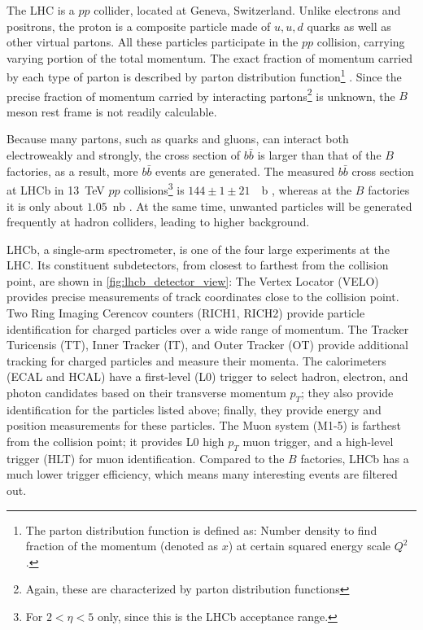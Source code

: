 The LHC is a $pp$ collider, located at Geneva, Switzerland.
Unlike electrons and positrons, the proton is a composite particle made of $u,
u, d$ quarks as well as other virtual partons.
All these particles participate in the $pp$ collision, carrying
varying portion of the total momentum.
The exact fraction of momentum carried by each type of parton is described by
parton distribution function\footnote{
    The parton distribution function is defined as:
    Number density to find fraction of the momentum (denoted as $x$) at certain
    squared energy scale $Q^2$.
} \cite{Ball:2014uwa}.
Since the precise fraction of momentum carried by interacting
partons\footnote{
    Again, these are characterized by parton distribution functions
} is unknown, the $B$ meson rest frame is not readily calculable.

Because many partons, such as quarks and gluons, can interact both
electroweakly and strongly,
the cross section of $b \bar{b}$ is larger than that of the $B$ factories, as a
result, more $b \bar{b}$ events are generated.
The measured $b \bar{b}$ cross section at LHCb in 13~TeV $pp$ collisions\footnote{
    For $2 < \eta < 5$ only, since this is the LHCb acceptance range.
} is $144 \pm 1 \pm 21$~\si{\mu b} \cite{Aaij:2016avz}, whereas at the $B$ factories it is only
about $1.05$~\si{nb} \cite{Harrison:1998yr}.
At the same time, unwanted particles will be generated frequently at hadron
colliders, leading to higher background.


LHCb, a single-arm spectrometer, is one of the four large experiments at the
LHC.
Its constituent subdetectors, from closest to farthest from the collision point,
are shown in \autoref{fig:lhcb_detector_view}:
The Vertex Locator (VELO) provides precise measurements of track coordinates
close to the collision point.
Two Ring Imaging Cerencov counters (RICH1, RICH2) provide particle
identification for charged particles over a wide range of momentum.
The Tracker Turicensis (TT), Inner Tracker (IT), and Outer Tracker (OT) provide
additional tracking for charged particles and measure their momenta.
The calorimeters (ECAL and HCAL) have a first-level (L0) trigger to select
hadron, electron, and photon candidates based on their transverse momentum
$p_T$;
they also provide identification for the particles listed above;
finally, they provide energy and position measurements for these particles.
The Muon system (M1-5) is farthest from the collision point;
it provides L0 high $p_T$ muon trigger, and a high-level trigger (HLT) for muon
identification. Compared to the $B$ factories, LHCb has a much lower trigger efficiency, which
means many interesting events are filtered out\cite{LHCb:2008}.

